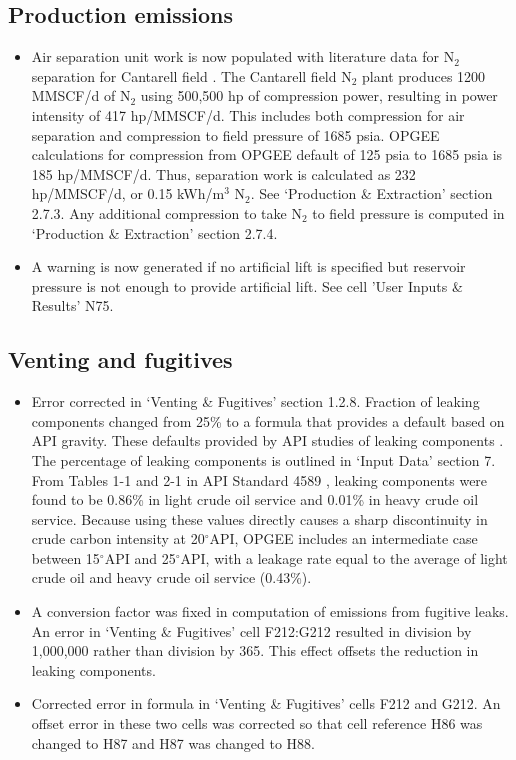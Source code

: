 \documentclass[11pt]{report}
\begin{document}
{{{{\subsection{Production emissions}

\begin{itemize}
\item Air separation unit work is now populated with literature data for N$_2$ separation for Cantarell field \cite{Kuo2001, Bocker2013}. The Cantarell field N$_2$ plant produces 1200 MMSCF/d of N$_2$ using 500,500 hp of compression power, resulting in power intensity of 417 hp/MMSCF/d. This includes both compression for air separation and compression to field pressure of 1685 psia. OPGEE calculations for compression from OPGEE default of 125 psia to 1685 psia is 185 hp/MMSCF/d. Thus, separation work is calculated as 232 hp/MMSCF/d, or 0.15 kWh/m$^3$ N$_2$. See `Production \& Extraction' section 2.7.3. Any additional compression to take N$_2$ to field pressure is computed in `Production \& Extraction' section 2.7.4. 
\item A warning is now generated if no artificial lift is specified but reservoir pressure is not enough to provide artificial lift. See cell 'User Inputs \& Results' N75. 
\end{itemize} 
\subsection{Venting and fugitives} 

\begin{itemize}
\item Error corrected in `Venting \& Fugitives' section 1.2.8. Fraction of leaking components changed from 25\% to a formula that provides a default based on API gravity. These defaults provided by API studies of leaking components \cite{API1993a}. The percentage of leaking components is outlined in `Input Data' section 7. From Tables 1-1 and 2-1 in API Standard 4589 \cite{API1993a}, leaking components were found to be 0.86\% in light crude oil service and 0.01\% in heavy crude oil service. Because using these values directly causes a sharp discontinuity in crude carbon intensity at 20$^\circ$API, OPGEE includes an intermediate case between 15$^\circ$API and 25$^\circ$API, with a leakage rate equal to the average of light crude oil and heavy crude oil service (0.43\%).
\item A conversion factor was fixed in computation of emissions from fugitive leaks. An error in `Venting \& Fugitives' cell F212:G212 resulted in division by 1,000,000 rather than division by 365. This effect offsets the reduction in leaking components. 
\item Corrected error in formula in `Venting \& Fugitives' cells F212 and G212. An offset error in these two cells was corrected so that cell reference H86 was changed to H87 and H87 was changed to H88. 
\end{itemize} 


}}}}
\end{document}
